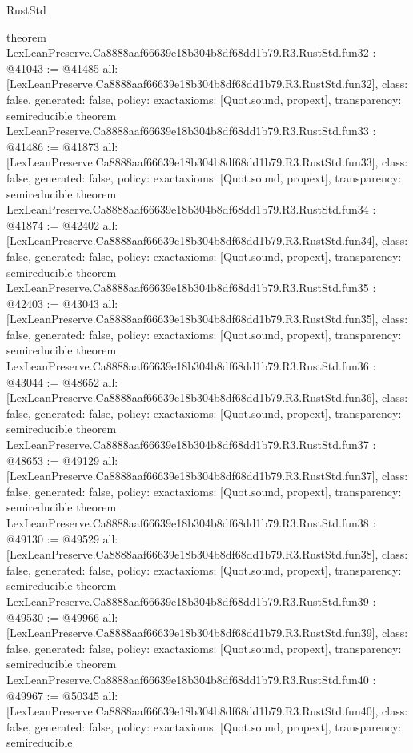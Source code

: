 \begin{lexlean}{RustStd}
\begin{coremodule}
{}
theorem LexLeanPreserve.Ca8888aaf66639e18b304b8df68dd1b79.R3.RustStd.fun32 : @41043 := @41485 {
  all: [LexLeanPreserve.Ca8888aaf66639e18b304b8df68dd1b79.R3.RustStd.fun32],
  class: false,
  generated: false,
  policy: exact{axioms: [Quot.sound, propext]},
  transparency: semireducible
}
theorem LexLeanPreserve.Ca8888aaf66639e18b304b8df68dd1b79.R3.RustStd.fun33 : @41486 := @41873 {
  all: [LexLeanPreserve.Ca8888aaf66639e18b304b8df68dd1b79.R3.RustStd.fun33],
  class: false,
  generated: false,
  policy: exact{axioms: [Quot.sound, propext]},
  transparency: semireducible
}
theorem LexLeanPreserve.Ca8888aaf66639e18b304b8df68dd1b79.R3.RustStd.fun34 : @41874 := @42402 {
  all: [LexLeanPreserve.Ca8888aaf66639e18b304b8df68dd1b79.R3.RustStd.fun34],
  class: false,
  generated: false,
  policy: exact{axioms: [Quot.sound, propext]},
  transparency: semireducible
}
theorem LexLeanPreserve.Ca8888aaf66639e18b304b8df68dd1b79.R3.RustStd.fun35 : @42403 := @43043 {
  all: [LexLeanPreserve.Ca8888aaf66639e18b304b8df68dd1b79.R3.RustStd.fun35],
  class: false,
  generated: false,
  policy: exact{axioms: [Quot.sound, propext]},
  transparency: semireducible
}
theorem LexLeanPreserve.Ca8888aaf66639e18b304b8df68dd1b79.R3.RustStd.fun36 : @43044 := @48652 {
  all: [LexLeanPreserve.Ca8888aaf66639e18b304b8df68dd1b79.R3.RustStd.fun36],
  class: false,
  generated: false,
  policy: exact{axioms: [Quot.sound, propext]},
  transparency: semireducible
}
theorem LexLeanPreserve.Ca8888aaf66639e18b304b8df68dd1b79.R3.RustStd.fun37 : @48653 := @49129 {
  all: [LexLeanPreserve.Ca8888aaf66639e18b304b8df68dd1b79.R3.RustStd.fun37],
  class: false,
  generated: false,
  policy: exact{axioms: [Quot.sound, propext]},
  transparency: semireducible
}
theorem LexLeanPreserve.Ca8888aaf66639e18b304b8df68dd1b79.R3.RustStd.fun38 : @49130 := @49529 {
  all: [LexLeanPreserve.Ca8888aaf66639e18b304b8df68dd1b79.R3.RustStd.fun38],
  class: false,
  generated: false,
  policy: exact{axioms: [Quot.sound, propext]},
  transparency: semireducible
}
theorem LexLeanPreserve.Ca8888aaf66639e18b304b8df68dd1b79.R3.RustStd.fun39 : @49530 := @49966 {
  all: [LexLeanPreserve.Ca8888aaf66639e18b304b8df68dd1b79.R3.RustStd.fun39],
  class: false,
  generated: false,
  policy: exact{axioms: [Quot.sound, propext]},
  transparency: semireducible
}
theorem LexLeanPreserve.Ca8888aaf66639e18b304b8df68dd1b79.R3.RustStd.fun40 : @49967 := @50345 {
  all: [LexLeanPreserve.Ca8888aaf66639e18b304b8df68dd1b79.R3.RustStd.fun40],
  class: false,
  generated: false,
  policy: exact{axioms: [Quot.sound, propext]},
  transparency: semireducible
}
\end{coremodule}
\end{lexlean}
